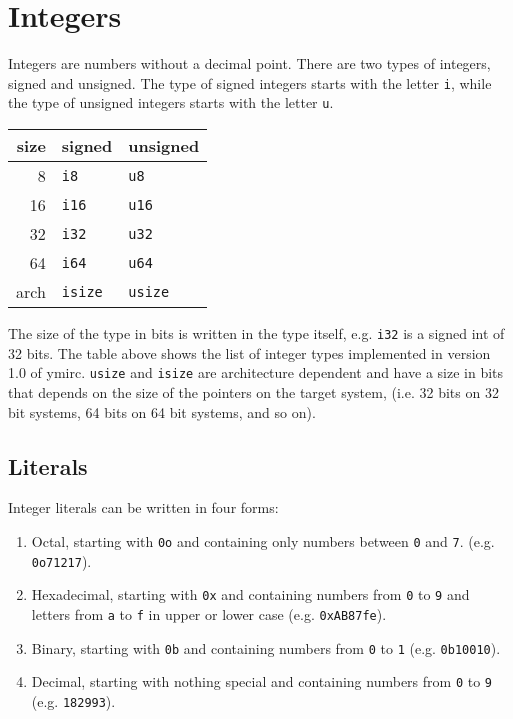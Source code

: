 \section{Integers}
\label{sec:orga8b7d2e}

Integers are numbers without a decimal point. There are two types of integers,
signed and unsigned. The type of signed integers starts with the letter
\texttt{i}, while the type of unsigned integers starts with the letter
\texttt{u}.

\begin{center}
  \begin{tabular}{|r|ll|}
    \hline
    size & signed & unsigned\\[0pt]
    \hline
    \hline
    8 & \texttt{i8} & \texttt{u8}\\[0pt]
    16 & \texttt{i16} & \texttt{u16}\\[0pt]
    32 & \texttt{i32} & \texttt{u32}\\[0pt]
    64 & \texttt{i64} & \texttt{u64}\\[0pt]
    arch & \texttt{isize} & \texttt{usize}\\[0pt]
    \hline
  \end{tabular}
\end{center}

The size of the type in bits is written in the type itself, e.g. \texttt{i32} is
a signed int of 32 bits. The table above shows the list of integer types
implemented in version 1.0 of ymirc. \texttt{usize} and \texttt{isize} are
architecture dependent and have a size in bits that depends on the size of the
pointers on the target system, (i.e. 32 bits on 32 bit systems, 64 bits on 64
bit systems, and so on).


\vspace{-10pt}%
\subsection{Literals}
\label{sec:org2cf045d}

Integer literals can be written in four forms:
\begin{enumerate}
\item Octal, starting with \texttt{0o} and containing only numbers between \texttt{0} and \texttt{7}. (e.g. \texttt{0o71217}).
  \vspace{-2pt}%
\item Hexadecimal, starting with \texttt{0x} and containing numbers from
  \texttt{0} to \texttt{9} and letters from \texttt{a} to \texttt{f} in upper or
  lower case (e.g. \texttt{0xAB87fe}).
  \vspace{-2pt}%
\item Binary, starting with \texttt{0b} and containing numbers from \texttt{0} to
  \texttt{1} (e.g. \texttt{0b10010}).
  \vspace{-2pt}%
\item Decimal, starting with nothing special and containing numbers from
  \texttt{0} to \texttt{9} (e.g. \texttt{182993}).
\end{enumerate}

